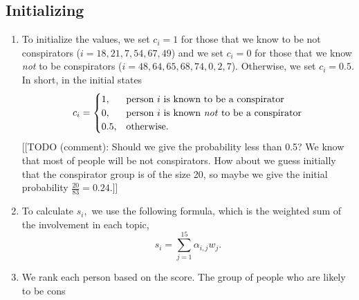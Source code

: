 \documentclass{icmmcm}
\begin{document}
\subsection{Initializing}
\begin{enumerate}
\item To initialize the values, we set $c_i = 1$ for those that
we know to be not conspirators ($i=18,21,7,54,67,49$)
and we set $c_i = 0$ for those that
we know \textit{not} to be conspirators ($i=48,64,65,68,74,0,2,7$).
Otherwise, we set $c_i = 0.5.$ In short, in the initial states
\[c_i=
\begin{cases}
1,	& \text{person $i$ is known to be a conspirator}\\
0,	& \text{person $i$ is known \textit{not} to be a conspirator}\\
0.5,	&\text{otherwise.}
\end{cases}\]
[[TODO (comment): Should we give the probability less than 0.5?
We know that most of people will be not conspirators. 
How about we guess initially that the conspirator group 
is of the size 20, so maybe we give the initial probability
$\frac{20}{83}  = 0.24$.]]

\item To calculate $s_i,$ we use the following formula,
which is the weighted sum of the involvement in each topic,
\[s_i = \sum_{j=1}^{15} \alpha_{i,j} w_j.\]

\item We rank each person based on the score.
The group of people who are likely to be 
cons
\end{enumerate}
\end{document}
